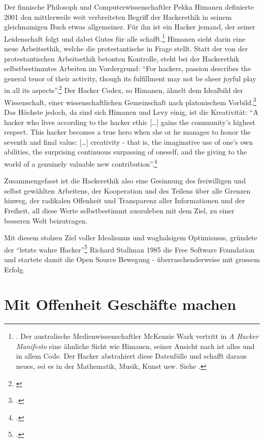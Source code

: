 \documentclass[
paper=164mm:234mm, %
pagesize, %
DIV=calc, %
10pt, %
parskip=half- %
]{scrbook}
\begin{document}
Der finnische Philosoph und Computerwissenschaftler Pekka Himanen definierte 2001 den mittlerweile weit verbreiteten Begriff der Hackerethik in seinem gleichnamigen Buch etwas allgemeiner. Für ihn ist ein Hacker jemand, der seiner Leidenschaft folgt und dabei Gutes für alle schafft.\footnote{\cite[3-6]{Himanen:2001}. Der australische Medienwissenschaftler McKenzie Wark vertritt in \emph{A Hacker Manifesto} eine ähnliche Sicht wie Himanen, seiner Ansicht nach ist alles und in allem Code. Der Hacker abstrahiert diese Datenfülle und schafft daraus neues, sei es in der Mathematik, Musik, Kunst usw. Siehe \cite[13]{McKenzie:2006}.} Himanen sieht darin eine neue Arbeitsethik, welche die protestantische in Frage stellt. Statt der von der protestantischen Arbeitsethik betonten Kontrolle, steht bei der Hackerethik selbstbestimmtes Arbeiten im Vordergrund: \enquote{For hackers, passion describes the general tenor of their activity, though its fulfillment may not be sheer joyful play in all its aspects}.\footnote{\cite[18]{Himanen:2001}} Der Hacker Codex, so Himanen, ähnelt dem Idealbild der Wissenschaft, einer wissenschaftlichen Gemeinschaft nach platonischem Vorbild.\footnote{\cite[7-19]{Himanen:2001}.} Das Höchste jedoch, da sind sich Himanen und Levy einig, ist die Kreativität: \enquote{A hacker who lives according to the hacker ethic [\dots] gains the community's highest respect. This hacker becomes a true hero when she or he manages to honor the seventh and final value: [\dots] creativity - that is, the imaginative use of one's own abilities, the surprising continuous surpassing of oneself, and the giving to the world of a genuinely valuable new contribution}.\footnote{\cite[141]{Himanen:2001}.}

Zusammengefasst ist die Hackerethik also eine Gesinnung des freiwilligen und selbst gewählten Arbeitens, der Kooperation und des Teilens über alle Grenzen hinweg, der radikalen Offenheit und Transparenz aller Informationen und der Freiheit, all diese Werte selbstbestimmt auszuleben mit dem Ziel, zu einer besseren Welt beizutragen.

Mit diesem stolzen Ziel voller Idealismus und waghalsigem Optimismus, gründete der \enquote{letzte wahre Hacker}\footnote{\cite[419]{Levy:1984}.} Richard Stallman 1985 die Free Software Foundation und startete damit die Open Source Bewegung - überraschenderweise mit grossem Erfolg.


{}
\section*{Mit Offenheit Geschäfte machen}
\end{document}
